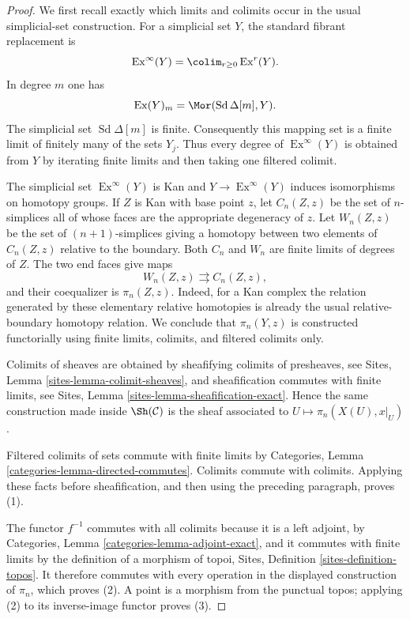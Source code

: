 \begin{proof}
We first recall exactly which limits and colimits occur in the usual
simplicial-set construction. For a simplicial set $Y$, the standard
fibrant replacement is
$$
\operatorname{Ex}^{\infty}(Y) =
\colim_{r \geq 0} \operatorname{Ex}^r(Y).
$$
In degree $m$ one has
$$
\operatorname{Ex}(Y)_m =
\Mor(\operatorname{Sd}\Delta[m], Y).
$$
The simplicial set $\operatorname{Sd}\Delta[m]$ is finite. Consequently
this mapping set is a finite limit of finitely many of the sets $Y_j$.
Thus every degree of $\operatorname{Ex}^{\infty}(Y)$ is obtained from
$Y$ by iterating finite limits and then taking one filtered colimit.

The simplicial set $\operatorname{Ex}^{\infty}(Y)$ is Kan and
$Y \to \operatorname{Ex}^{\infty}(Y)$ induces isomorphisms on homotopy
groups. If $Z$ is Kan with base point $z$, let $C_n(Z, z)$ be the set of
$n$-simplices all of whose faces are the appropriate degeneracy of $z$.
Let $W_n(Z, z)$ be the set of $(n + 1)$-simplices giving a homotopy between
two elements of $C_n(Z, z)$ relative to the boundary. Both $C_n$ and $W_n$
are finite limits of degrees of $Z$. The two end faces give maps
$$
W_n(Z, z) \rightrightarrows C_n(Z, z),
$$
and their coequalizer is $\pi_n(Z, z)$. Indeed, for a Kan complex the
relation generated by these elementary relative homotopies is already the
usual relative-boundary homotopy relation. We conclude that
$\pi_n(Y, z)$ is constructed functorially using finite limits, colimits,
and filtered colimits only.

Colimits of sheaves are obtained by sheafifying colimits of presheaves,
see Sites, Lemma \ref{sites-lemma-colimit-sheaves}, and sheafification
commutes with finite limits, see Sites, Lemma
\ref{sites-lemma-sheafification-exact}. Hence the same construction made
inside $\Sh(\mathcal{C})$ is the sheaf associated to
$U \mapsto \pi_n(X(U), x|_U)$.

Filtered colimits of sets commute with finite limits by
Categories, Lemma \ref{categories-lemma-directed-commutes}. Colimits
commute with colimits. Applying these facts before sheafification, and
then using the preceding paragraph, proves (1).

The functor $f^{-1}$ commutes with all colimits because it is a left
adjoint, by Categories, Lemma \ref{categories-lemma-adjoint-exact}, and
it commutes with finite limits by the definition of a morphism of topoi,
Sites, Definition \ref{sites-definition-topos}. It therefore commutes
with every operation in the displayed construction of $\pi_n$, which
proves (2). A point is a morphism from the punctual topos; applying (2)
to its inverse-image functor proves (3).
\end{proof}
